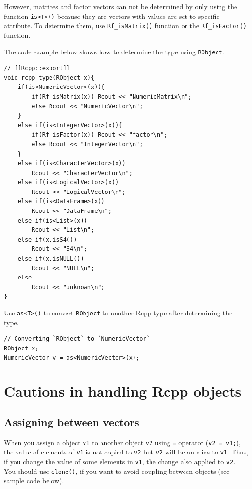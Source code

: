 \documentclass[]{book}
\begin{document}
However, matrices and factor vectors can not be determined by only using the function \texttt{is\textless{}T\textgreater{}()} because they are vectors with values are set to specific attribute. To determine them, use \texttt{Rf\_isMatrix()} function or the \texttt{Rf\_isFactor()} function.

The code example below shows how to determine the type using \texttt{RObject}.

\begin{verbatim}
// [[Rcpp::export]]
void rcpp_type(RObject x){
    if(is<NumericVector>(x)){
        if(Rf_isMatrix(x)) Rcout << "NumericMatrix\n";
        else Rcout << "NumericVector\n";       
    }
    else if(is<IntegerVector>(x)){
        if(Rf_isFactor(x)) Rcout << "factor\n";
        else Rcout << "IntegerVector\n";
    }
    else if(is<CharacterVector>(x))
        Rcout << "CharacterVector\n";
    else if(is<LogicalVector>(x))
        Rcout << "LogicalVector\n";
    else if(is<DataFrame>(x))
        Rcout << "DataFrame\n";
    else if(is<List>(x))
        Rcout << "List\n";
    else if(x.isS4())
        Rcout << "S4\n";
    else if(x.isNULL())
        Rcout << "NULL\n";
    else
        Rcout << "unknown\n";
}
\end{verbatim}

Use \texttt{as\textless{}T\textgreater{}()} to convert \texttt{RObject} to another Rcpp type after determining the type.

\begin{verbatim}
// Converting `RObject` to `NumericVector`
RObject x;
NumericVector v = as<NumericVector>(x);
\end{verbatim}

\hypertarget{cautions-in-handling-rcpp-objects}{%
\chapter{Cautions in handling Rcpp objects}\label{cautions-in-handling-rcpp-objects}}

\hypertarget{assigning-between-vectors}{%
\section{Assigning between vectors}\label{assigning-between-vectors}}

When you assign a object \texttt{v1} to another object \texttt{v2} using \texttt{=} operator (\texttt{v2\ =\ v1;}), the value of elements of \texttt{v1} is not copied to \texttt{v2} but \texttt{v2} will be an alias to \texttt{v1}. Thus, if you change the value of some elements in \texttt{v1}, the change also applied to \texttt{v2}. You should use \texttt{clone()}, if you want to avoid coupling between objects (see sample code below).
\end{document}
